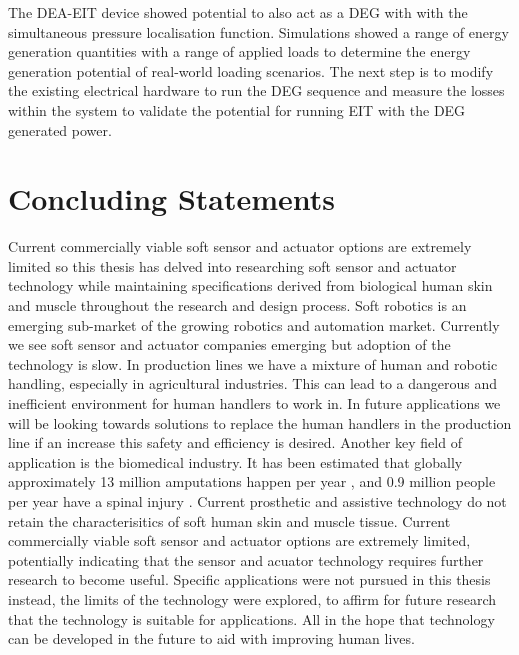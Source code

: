 The DEA-EIT device showed potential to also act as a DEG with with the simultaneous pressure localisation function. Simulations showed a range of energy generation quantities with a range of applied loads to determine the energy generation potential of real-world loading scenarios. The next step is to modify the existing electrical hardware to run the DEG sequence and measure the losses within the system to validate the potential for running EIT with the DEG generated power.

\section{Concluding Statements}
Current commercially viable soft sensor and actuator options are extremely limited so this thesis has delved into researching soft sensor and actuator technology while maintaining specifications derived from biological human skin and muscle throughout the research and design process. Soft robotics is an emerging sub-market of the growing robotics and automation market. Currently we see soft sensor and actuator companies emerging but adoption of the technology is slow. In production lines we have a mixture of human and robotic handling, especially in agricultural industries. This can lead to a dangerous and inefficient environment for human handlers to work in. In future applications we will be looking towards solutions to replace the human handlers in the production line if an increase this safety and efficiency is desired. Another key field of application is the biomedical industry. It has been estimated that globally approximately 13 million amputations happen per year \cite{Yuan2023a}, and 0.9 million people per year have a spinal injury \cite{Ding2022}. Current prosthetic and assistive technology do not retain the characterisitics of soft human skin and muscle tissue. Current commercially viable soft sensor and actuator options are extremely limited, potentially indicating that the sensor and acuator technology requires further research to become useful. Specific applications were not pursued in this thesis instead, the limits of the technology were explored, to affirm for future research that the technology is suitable for applications. All in the hope that technology can be developed in the future to aid with improving human lives.



